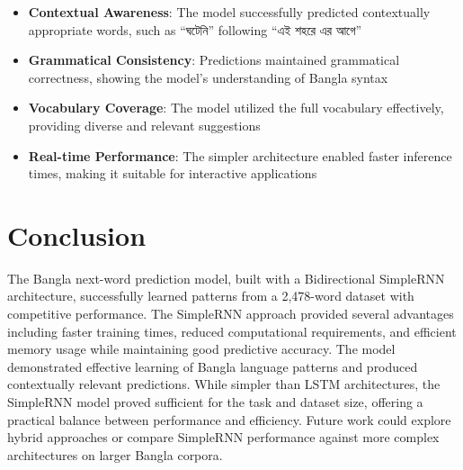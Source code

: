 \documentclass[12pt]{article}
\begin{document}
\begin{itemize}
    \item \textbf{Contextual Awareness}: The model successfully predicted contextually appropriate words, such as {\bengalifont ``ঘটেনি''} following {\bengalifont ``এই শহরে এর আগে''}
    \item \textbf{Grammatical Consistency}: Predictions maintained grammatical correctness, showing the model's understanding of Bangla syntax
    \item \textbf{Vocabulary Coverage}: The model utilized the full vocabulary effectively, providing diverse and relevant suggestions
    \item \textbf{Real-time Performance}: The simpler architecture enabled faster inference times, making it suitable for interactive applications
\end{itemize}

\section*{Conclusion}
The Bangla next-word prediction model, built with a Bidirectional SimpleRNN architecture, successfully learned patterns from a 2,478-word dataset with competitive performance. The SimpleRNN approach provided several advantages including faster training times, reduced computational requirements, and efficient memory usage while maintaining good predictive accuracy. The model demonstrated effective learning of Bangla language patterns and produced contextually relevant predictions. While simpler than LSTM architectures, the SimpleRNN model proved sufficient for the task and dataset size, offering a practical balance between performance and efficiency. Future work could explore hybrid approaches or compare SimpleRNN performance against more complex architectures on larger Bangla corpora.
\end{document}
